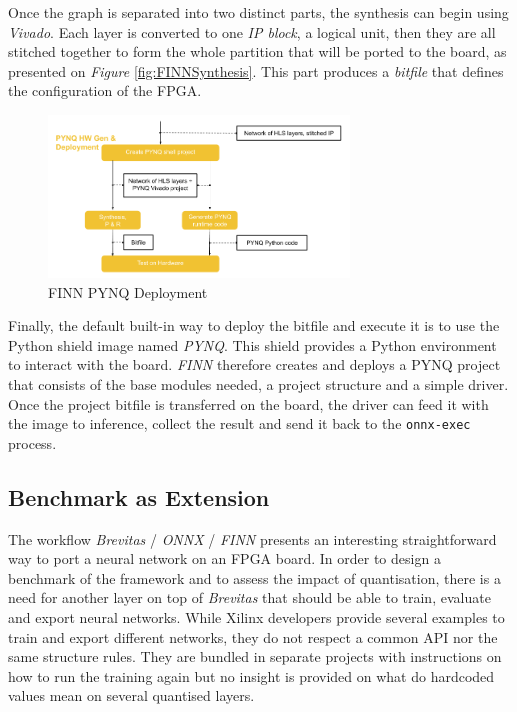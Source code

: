 Once the graph is separated into two distinct parts, the synthesis can begin using \emph{Vivado}. Each layer is converted to one \emph{IP block}, a logical unit, then they are all stitched together to form the whole partition that will be ported to the board, as presented on \emph{Figure} \ref{fig:FINNSynthesis}. This part produces a \emph{bitfile} that defines the configuration of the FPGA.

\begin{figure}[htbp]
	\centering
		\includegraphics[width=8cm]{Figures/FINNPYNQ.png}
	\caption[FINN PYNQ Deployment]{FINN PYNQ Deployment}
	\label{fig:FINNPYNQ}
\end{figure}

Finally, the default built-in way to deploy the bitfile and execute it is to use the Python shield image named \emph{PYNQ}. This shield provides a Python environment to interact with the board. \emph{FINN} therefore creates and deploys a PYNQ project that consists of the base modules needed, a project structure and a simple driver. Once the project bitfile is transferred on the board, the driver can feed it with the image to inference, collect the result and send it back to the \texttt{onnx-exec} process.


\subsection{Benchmark as Extension}

The workflow \emph{Brevitas} / \emph{ONNX} / \emph{FINN} presents an interesting straightforward way to port a neural network on an FPGA board. In order to design a benchmark of the framework and to assess the impact of quantisation, there is a need for another layer on top of \emph{Brevitas} that should be able to train, evaluate and export neural networks. While Xilinx developers provide several examples to train and export different networks, they do not respect a common API nor the same structure rules. They are bundled in separate projects with instructions on how to run the training again but no insight is provided on what do hardcoded values mean on several quantised layers.

